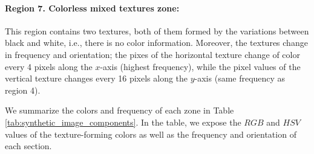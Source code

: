 \paragraph{Region 7. Colorless mixed textures zone:}
This region contains two textures, both of them formed by the variations between black and white, i.e., there is no color information. Moreover, the textures change in frequency and orientation; the pixes of the horizontal texture change of color every 4 pixels along the $x$-axis (highest frequency), while the pixel values of the vertical texture changes every 16 pixels along the $y$-axis (same frequency as region 4).

We summarize the colors and frequency of each zone in Table \ref{tab:synthetic_image_components}. In the table, we expose the $RGB$ and $HSV$ values of the texture-forming colors as well as the frequency and orientation of each section.


